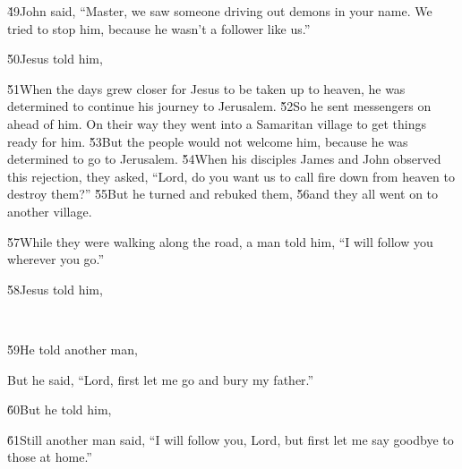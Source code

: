 \v{49}John said, ``Master, we saw someone driving out demons in your name. We tried to stop him, because he wasn't a follower like us.''

\v{50}Jesus told him, 

\v{51}When the days grew closer for Jesus to be taken up to heaven, he was determined to continue his journey to Jerusalem. \v{52}So he sent messengers on ahead of him. On their way they went into a Samaritan village to get things ready for him. \v{53}But the people would not welcome him, because he was determined to go to Jerusalem. \v{54}When his disciples James and John observed this rejection, they asked, ``Lord, do you want us to call fire down from heaven to destroy them?'' \v{55}But he turned and rebuked them, \v{56}and they all went on to another village.

\v{57}While they were walking along the road, a man told him, ``I will follow you wherever you go.''

\v{58}Jesus told him,

\begin{poetry}
\poeml {} \\
\poemll    {}
\end{poetry}

\v{59}He told another man, 

But he said, ``Lord, first let me go and bury my father.''

\v{60}But he told him, 

\v{61}Still another man said, ``I will follow you, Lord, but first let me say goodbye to those at home.''

